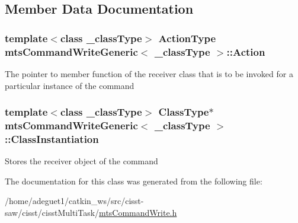 \subsection{Member Data Documentation}
\hypertarget{classmts_command_write_generic_ac0a7ab9bf5bf14479f46d2f32a259de6}{
\subsubsection[{Action}]{\setlength{\rightskip}{0pt plus 5cm}template$<$class \-\_\-class\-Type$>$ {\bf Action\-Type} {\bf mts\-Command\-Write\-Generic}$<$ \-\_\-class\-Type $>$\-::Action\hspace{0.3cm}{\ttfamily [protected]}}}\label{classmts_command_write_generic_ac0a7ab9bf5bf14479f46d2f32a259de6}
The pointer to member function of the receiver class that is to be invoked for a particular instance of the command \hypertarget{classmts_command_write_generic_a9417d03cc4cc313622021ba6a94f1994}{
\subsubsection[{Class\-Instantiation}]{\setlength{\rightskip}{0pt plus 5cm}template$<$class \-\_\-class\-Type$>$ {\bf Class\-Type}$\ast$ {\bf mts\-Command\-Write\-Generic}$<$ \-\_\-class\-Type $>$\-::Class\-Instantiation\hspace{0.3cm}{\ttfamily [protected]}}}\label{classmts_command_write_generic_a9417d03cc4cc313622021ba6a94f1994}
Stores the receiver object of the command 

The documentation for this class was generated from the following file\-:\begin{DoxyCompactItemize}
\item 
/home/adeguet1/catkin\-\_\-ws/src/cisst-\/saw/cisst/cisst\-Multi\-Task/\hyperlink{mts_command_write_8h}{mts\-Command\-Write.\-h}\end{DoxyCompactItemize}

